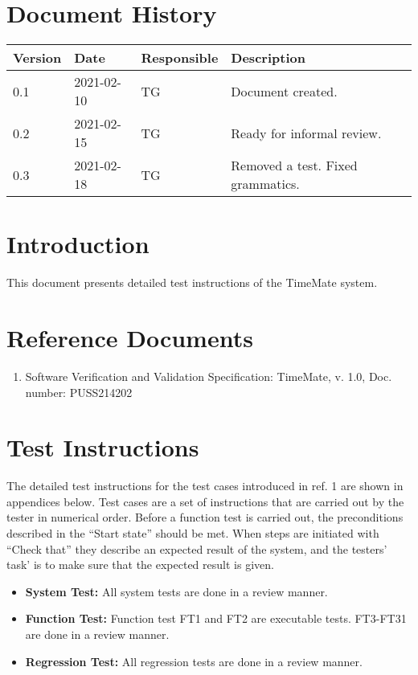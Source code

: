 \documentclass{article}
\date {#1}
\title {
    \documentNumber {03}    
    
    \documentVersion {0.3}
    
    \documentTitle {Software Verification and Validation Instructions}
    \documentGroup {2}
 
    \documentResponsible {Test Group}
    \documentAuthors {Test Group}
    
    \documentDate {2021-02-18}
}
\begin{document}
\maketitle
\thispagestyle{empty}

\newpage

\tableofcontents

\newpage


\section{Document History}
\begin{tabular}{ l | l | l | l }
    Version & Date & Responsible & Description \\
    \hline
   0.1 & 2021-02-10 & TG & Document created. \\
   0.2 & 2021-02-15 & TG & Ready for informal review. \\
    0.3 & 2021-02-18 & TG & Removed a test. Fixed grammatics. \\
\end{tabular}

\section{Introduction}
This document presents detailed test instructions of the  TimeMate system.

\section{Reference Documents}
\begin{enumerate}
	\item Software Verification and Validation Specification: 	TimeMate, v. 1.0, Doc. number: PUSS214202
\end{enumerate}

\section{Test Instructions}
The detailed test instructions for the test cases introduced in ref. 1 are shown in appendices below. Test cases are a set of instructions that are carried out by the tester in numerical order. Before a function test is carried out, the preconditions described in the “Start state” should be met. When steps are initiated with “Check that” they describe an expected result of the system, and the testers' task' is to make sure that the expected result is given.
\begin{itemize}
\item \textbf{System Test:} All system tests are done in a review manner. 
\item \textbf{Function Test:} Function test FT1 and FT2 are executable tests. FT3-FT31 are done in a review manner. 
\item \textbf{Regression Test:} All regression tests are done in a review manner. 

\end{itemize}
\end{document}
